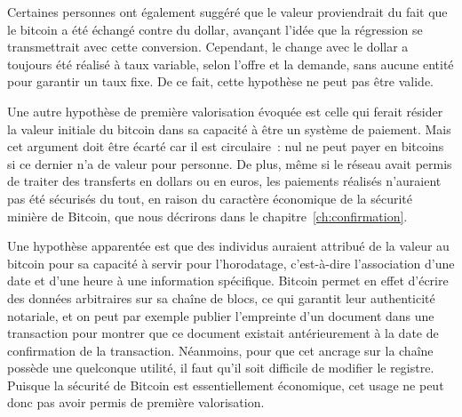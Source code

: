 
Certaines personnes ont également suggéré que le valeur proviendrait du fait que le bitcoin a été échangé contre du dollar, avançant l'idée que la régression se transmettrait avec cette conversion. Cependant, le change avec le dollar a toujours été réalisé à taux variable, selon l'offre et la demande, sans aucune entité pour garantir un taux fixe. De ce fait, cette hypothèse ne peut pas être valide.


Une autre hypothèse de première valorisation évoquée est celle qui ferait résider la valeur initiale du bitcoin dans sa capacité à être un système de paiement. Mais cet argument doit être écarté car il est circulaire~: nul ne peut payer en bitcoins si ce dernier n'a de valeur pour personne. De plus, même si le réseau avait permis de traiter des transferts en dollars ou en euros, les paiements réalisés n'auraient pas été sécurisés du tout, en raison du caractère économique de la sécurité minière de Bitcoin, que nous décrirons dans le chapitre~\ref{ch:confirmation}.


Une hypothèse apparentée est que des individus auraient attribué de la valeur au bitcoin pour sa capacité à servir pour l'horodatage, c'est-à-dire l'association d'une date et d'une heure à une information spécifique. Bitcoin permet en effet d'écrire des données arbitraires sur sa chaîne de blocs, ce qui garantit leur authenticité notariale, et on peut par exemple publier l'empreinte d'un document dans une transaction pour montrer que ce document existait antérieurement à la date de confirmation de la transaction. Néanmoins, pour que cet ancrage sur la chaîne possède une quelconque utilité, il faut qu'il soit difficile de modifier le registre. Puisque la sécurité de Bitcoin est essentiellement économique, cet usage ne peut donc pas avoir permis de première valorisation.

